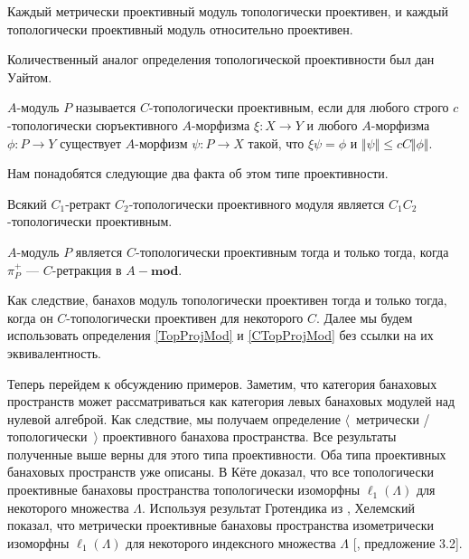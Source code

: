 \begin{proposition}\label{MetProjIsTopProjAndTopProjIsRelProj} Каждый метрически проективный модуль топологически проективен, и каждый топологически проективный модуль относительно проективен.
\end{proposition}

Количественный аналог определения топологической проективности был дан Уайтом.

\begin{definition}\label{CTopProjMod} $A$-модуль $P$ называется $C$-топологически проективным, если для любого строго $c$-топологически сюръективного $A$-морфизма $\xi:X\to Y$ и любого $A$-морфизма $\phi:P\to Y$ существует $A$-морфизм $\psi:P\to X$ такой, что $\xi\psi=\phi$ и $\Vert\psi\Vert\leq cC\Vert\phi\Vert$.
\end{definition}

Нам понадобятся следующие два факта об этом типе проективности.

\begin{proposition}\label{RetrCTopProjIsCTopProj} Всякий $C_1$-ретракт $C_2$-топологически проективного модуля является $C_1C_2$-топологически проективным.
\end{proposition}

\begin{proposition}\label{CTopProjModViaCanonicMorph} $A$-модуль $P$ является $C$-топологически проективным тогда и только тогда, когда $\pi_P^+$ --- $C$-ретракция в $A-\mathbf{mod}$.
\end{proposition}

Как следствие, банахов модуль топологически проективен тогда и только тогда, когда он $C$-топологически проективен для некоторого $C$. Далее мы будем использовать определения \ref{TopProjMod} и \ref{CTopProjMod} без ссылки на их эквивалентность.

Теперь перейдем к обсуждению примеров. Заметим, что категория банаховых пространств может рассматриваться как категория левых банаховых модулей над нулевой алгеброй. Как следствие, мы получаем определение $\langle$~метрически / топологически~$\rangle$ проективного банахова пространства. Все результаты полученные выше верны для этого типа проективности. Оба типа проективных банаховых пространств уже описаны. В \cite{KotheTopProjBanSp} Кёте доказал, что все топологически проективные банаховы пространства топологически изоморфны $\ell_1(\Lambda)$ для некоторого множества $\Lambda$. Используя результат Гротендика из \cite{GrothMetrProjFlatBanSp}, Хелемский показал, что метрически проективные банаховы пространства изометрически изоморфны $\ell_1(\Lambda)$ для некоторого индексного множества $\Lambda$ [\cite{HelMetrFrQMod}, предложение 3.2].

